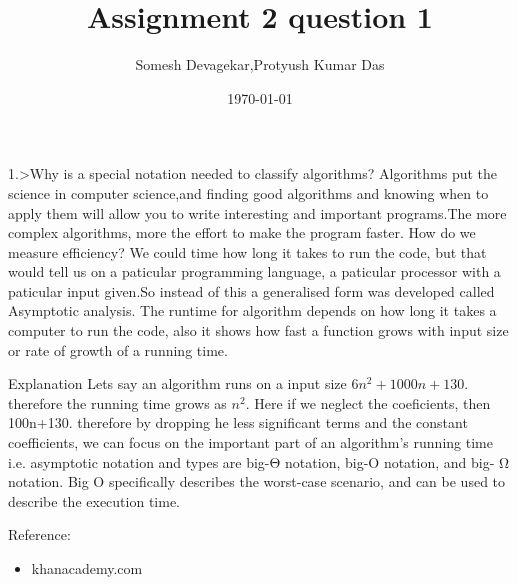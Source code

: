 \documentclass{beamer}
\title[Short title]{Assignment 2 } %
\author{Somesh Devagekar,Protyush Kumar  Das} %
\institute[H-BRS] %
{
Hochschule Bonn-Rhein-Sieg \\ %
\medskip
\textit{somesh.devagekar@smail.inf.h-brs.de\\protyush.das@smail.inf.h-brs.de} %
}
\date{\today} %
\begin{document}
\begin{frame}
\titlepage 
\end{frame}

\begin{frame}
\title{question 1} 
\begin{block}{1.>Why is a special notation needed to classify algorithms?}
Algorithms put the science in computer science,and finding good algorithms and knowing when to apply them will allow you to write interesting and important programs.The more complex algorithms, more the effort to make the program faster. 
How do we measure efficiency? We could time how long it takes to run the code, but that would tell us on a paticular programming language, a paticular processor with a paticular input given.So instead of this a generalised form was developed called Asymptotic analysis.
The runtime for algorithm depends on how long it takes a computer to run the code, also it shows how fast a function grows with input size or rate of growth of a running time.
\end{block}
\end{frame}

\begin{frame}
\begin{block}{Explanation}
Lets say an algorithm runs on a input size $6n^{2}+1000n+130$.
therefore the running time grows as $n^{2}$.
Here if we neglect the coeficients, then 100n+130.
therefore by dropping he less significant terms and the constant coefficients, we can focus on the important part of an algorithm's running time i.e. asymptotic notation and types are big-Θ notation, big-O notation, and big- Ω notation.
Big O specifically describes the worst-case scenario, and can be used to describe the execution time. 
\end{block}

\begin{block}{Reference:}
\begin{itemize}
	\item khanacademy.com
\end{itemize}
\end{block}
\end{frame}
\end{document}
